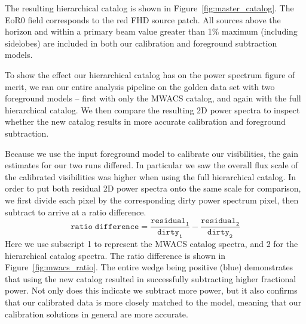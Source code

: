 \documentclass[iop]{emulateapj}
\begin{document}
The resulting hierarchical catalog is shown in Figure~\ref{fig:master_catalog}. The EoR0 
field corresponds to the red FHD source patch. All sources above the horizon and within a 
primary beam value greater than 1\% maximum (including sidelobes) are included in both 
our calibration and foreground subtraction models.  

To show the effect our hierarchical catalog has on the power spectrum figure of merit, we 
ran our entire analysis pipeline on the golden data set with two foreground models -- first 
with only the MWACS catalog, and again with the full hierarchical catalog. We then 
compare the resulting 2D power spectra to inspect whether the new catalog results in more 
accurate calibration and foreground subtraction.

Because we use the input foreground model to calibrate our visibilities, the gain estimates 
for our two runs differed. In particular we saw the overall flux scale of the calibrated 
visibilities was higher when using the full hierarchical catalog. In order to put both residual 
2D power spectra onto the same scale for comparison, we first divide each pixel by the 
corresponding dirty power spectrum pixel, then subtract to arrive at a ratio difference. 
\begin{equation}\label{eq:diff_ratio}
\mathtt{ratio\;difference = \frac{residual_1}{dirty_1} - \frac{residual_2}{dirty_2}}
\end{equation}
Here we use subscript 1 to represent the MWACS catalog spectra, and 2 for the 
hierarchical catalog spectra. The ratio difference is shown in Figure~\ref{fig:mwacs_ratio}. 
The entire wedge being positive (blue) demonstrates that using the new catalog resulted in 
successfully subtracting higher fractional power. Not only does this indicate we subtract 
more power, but it also confirms that our calibrated data is more closely matched to the 
model, meaning that our calibration solutions in general are more accurate.
\end{document}
